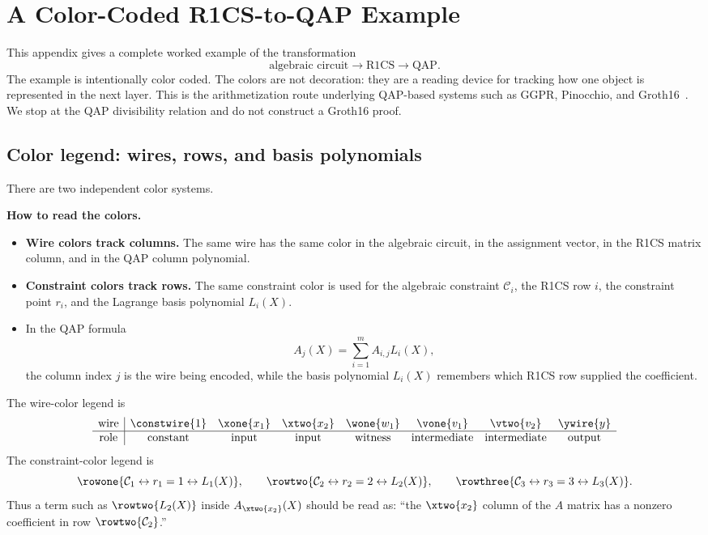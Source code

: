 ﻿\section{A Color-Coded R1CS-to-QAP Example}
\label{app:r1cs-qap-example}

This appendix gives a complete worked example of the transformation
\[
    \text{algebraic circuit}\longrightarrow \text{R1CS}\longrightarrow \text{QAP}.
\]
The example is intentionally color coded. The colors are not decoration: they are a reading device for tracking how one object is represented in the next layer. This is the arithmetization route underlying QAP-based systems such as GGPR, Pinocchio, and Groth16~\cite{GennaroGentryParnoRaykova2013,ParnoHowellGentryRaykova2013,Groth2016}. We stop at the QAP divisibility relation and do not construct a Groth16 proof.

\subsection{Color legend: wires, rows, and basis polynomials}

There are two independent color systems.

\begin{tcolorbox}
\textbf{How to read the colors.}
\begin{itemize}[leftmargin=2em]
    \item \textbf{Wire colors track columns.} The same wire has the same color in the algebraic circuit, in the assignment vector, in the R1CS matrix column, and in the QAP column polynomial.
    \item \textbf{Constraint colors track rows.} The same constraint color is used for the algebraic constraint $\mathcal C_i$, the R1CS row $i$, the constraint point $r_i$, and the Lagrange basis polynomial $L_i(X)$.
    \item In the QAP formula
    \[
        A_j(X)=\sum_{i=1}^{m} A_{i,j} L_i(X),
    \]
    the column index $j$ is the wire being encoded, while the basis polynomial $L_i(X)$ remembers which R1CS row supplied the coefficient.
\end{itemize}
\end{tcolorbox}

The wire-color legend is
\[
\begin{array}{c|ccccccc}
\text{wire} & \constwire{1} & \xone{x_1} & \xtwo{x_2} & \wone{w_1} & \vone{v_1} & \vtwo{v_2} & \ywire{y} \\
\hline
\text{role} & \text{constant} & \text{input} & \text{input} & \text{witness} & \text{intermediate} & \text{intermediate} & \text{output}
\end{array}
\]
The constraint-color legend is
\[
    \rowone{\mathcal C_1\leftrightarrow r_1=1\leftrightarrow L_1(X)},
    \qquad
    \rowtwo{\mathcal C_2\leftrightarrow r_2=2\leftrightarrow L_2(X)},
    \qquad
    \rowthree{\mathcal C_3\leftrightarrow r_3=3\leftrightarrow L_3(X)}.
\]
Thus a term such as $\rowtwo{L_2(X)}$ inside $A_{\xtwo{x_2}}(X)$ should be read as: ``the $\xtwo{x_2}$ column of the $A$ matrix has a nonzero coefficient in row $\rowtwo{\mathcal C_2}$.''


